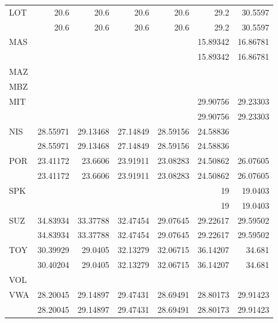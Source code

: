 \begin{tabular}{lrrrrrr}
LOT & 20.6 & 20.6 & 20.6 & 20.6 & 29.2 & 30.5597 \\
 & 20.6 & 20.6 & 20.6 & 20.6 & 29.2 & 30.5597 \\
MAS &  &  &  &  & 15.89342 & 16.86781 \\
 &  &  &  &  & 15.89342 & 16.86781 \\
MAZ &  &  &  &  &  &  \\
MBZ &  &  &  &  &  &  \\
MIT &  &  &  &  & 29.90756 & 29.23303 \\
 &  &  &  &  & 29.90756 & 29.23303 \\
NIS & 28.55971 & 29.13468 & 27.14849 & 28.59156 & 24.58836 &  \\
 & 28.55971 & 29.13468 & 27.14849 & 28.59156 & 24.58836 &  \\
POR & 23.41172 & 23.6606 & 23.91911 & 23.08283 & 24.50862 & 26.07605 \\
 & 23.41172 & 23.6606 & 23.91911 & 23.08283 & 24.50862 & 26.07605 \\
SPK &  &  &  &  & 19 & 19.0403 \\
 &  &  &  &  & 19 & 19.0403 \\
SUZ & 34.83934 & 33.37788 & 32.47454 & 29.07645 & 29.22617 & 29.59502 \\
 & 34.83934 & 33.37788 & 32.47454 & 29.07645 & 29.22617 & 29.59502 \\
TOY & 30.39929 & 29.0405 & 32.13279 & 32.06715 & 36.14207 & 34.681 \\
 & 30.40204 & 29.0405 & 32.13279 & 32.06715 & 36.14207 & 34.681 \\
VOL &  &  &  &  &  &  \\
VWA & 28.20045 & 29.14897 & 29.47431 & 28.69491 & 28.80173 & 29.91423 \\
 & 28.20045 & 29.14897 & 29.47431 & 28.69491 & 28.80173 & 29.91423 \\
\bottomrule
\end{tabular}

